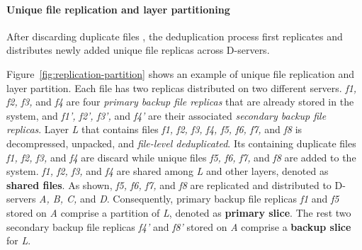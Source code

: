
\paragraph{Unique file replication and layer partitioning}

After discarding duplicate files%
, the deduplication process first replicates and distributes newly added unique file replicas across D-servers.

Figure~\ref{fig:replication-partition} shows an example of unique file replication and layer partition.
Each file has two replicas distributed on two different servers.
\emph{f1, f2, f3,} and \emph{f4} are four \emph{primary backup file replicas} that are already stored in the system,
and \emph{f1', f2', f3',} and \emph{f4'} are their associated \emph{secondary backup file replicas}. 
Layer \emph{L} that contains files \emph{f1, f2, f3, f4, f5, f6, f7,} and \emph{f8} 
is decompressed, unpacked, and \emph{file-level deduplicated}.
Its containing duplicate files \emph{f1, f2, f3,} and \emph{f4} are discard
while unique files
\emph{f5, f6, f7,} and \emph{f8} are added to the system.
 \emph{f1, f2, f3,} and \emph{f4} are shared among \emph{L} and other layers, denoted as \textbf{shared files}.
As shown, \emph{f5, f6, f7,} and \emph{f8} are replicated and distributed to D-servers \emph{A, B, C,} and \emph{D}.
Consequently,
primary backup file replicas \emph{f1} and \emph{f5} stored on \emph{A} comprise a partition of \emph{L},
denoted as \textbf{primary slice}.
The rest two secondary backup file replicas \emph{f4'} and \emph{f8'} stored on \emph{A} comprise a \textbf{backup slice} for \emph{L}.

